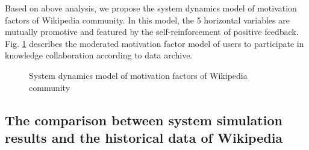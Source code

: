 \documentclass[doublespacing]{elsarticle}
\begin{document}
Based on above analysis, we propose the system dynamics model of
motivation factors of
Wikipedia community.   In this model, the 5 horizontal variables are mutually
promotive and featured by the self-reinforcement of positive
feedback. Fig. \ref{fig:sdmodel} describes the moderated motivation factor model of
users to participate in knowledge collaboration according to  data archive.

\begin{figure}[htpb]
 
  \centering
  \caption{System dynamics model of motivation factors of Wikipedia community }
   \label{fig:sdmodel}
\end{figure}



\subsection{The comparison between system simulation results and the historical data of Wikipedia}
\label{sec:comp-betw-syst}
\end{document}
